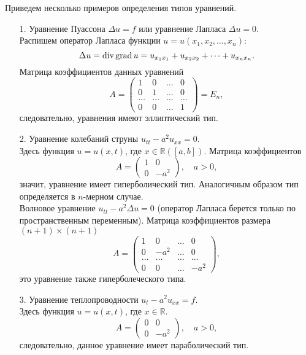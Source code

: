 \documentclass[12pt,a5paper]{book}
\begin{document}
	Приведем несколько примеров определения типов уравнений.
	\begin{itemize}
		\item [1.] Уравнение Пуассона $\Delta u = f$ или уравнение Лапласа $\Delta u = 0$. \\
		Распишем оператор Лапласа функции $u = u(x_1, x_2, \dots, x_n)$:
		\begin{equation*}
			\Delta u = \text{div\,grad}\,u = u_{x_1x_1} + u_{x_2x_2} + \dots + u_{x_nx_n}.
		\end{equation*}
		Матрица коэффициентов данных уравнений
		\begin{equation*}
			A = \begin{pmatrix}
				1 & 0 & \dots & 0 \\
				0 & 1 & \dots & 0 \\
				\dots & \dots & \dots & \dots \\
				0 & 0 & \dots & 1 
			\end{pmatrix} = E_n,
		\end{equation*}
		следовательно, уравнения имеют эллиптический тип.
		\item [2.] Уравнение колебаний струны $u_{tt} - a^2u_{xx} = 0$. \\
		Здесь функция $u = u(x,t)$, где $x \in \mathbb{R}([a,b])$. Матрица коэффициентов
		\begin{equation*}
			A = \begin{pmatrix}
				1 & 0  \\
				0 & -a^2
			\end{pmatrix}, \quad a > 0,
		\end{equation*}
		значит, уравнение имеет гиперболический тип. Аналогичным образом тип определяется в $n$-мерном случае. \\
		Волновое уравнение $u_{tt} - a^2\Delta u = 0$ (оператор Лапласа берется только по пространственным переменным). Матрица коэффициентов размера $(n+1)\times(n+1)$
		\begin{equation*}
			A = \begin{pmatrix}
				1 & 0 & \dots & 0 \\
				0 & -a^2 & \dots & 0 \\
				\dots & \dots & \dots & \dots \\
				0 & 0 & \dots & -a^2 
			\end{pmatrix},
		\end{equation*}
		это уравнение также гиперболеческого типа.
		\item [3.] Уравнение теплопроводности $u_t - a^2u_{xx} = f$. \\
		Здесь функция $u = u(x,t)$, где $x \in \mathbb{R}$.
		\begin{equation*}
			A = \begin{pmatrix}
				0 & 0  \\
				0 & -a^2
			\end{pmatrix}, \quad a > 0,
		\end{equation*}
		следовательно, данное уравнение имеет параболический тип.
	\end{itemize}
\end{document}

